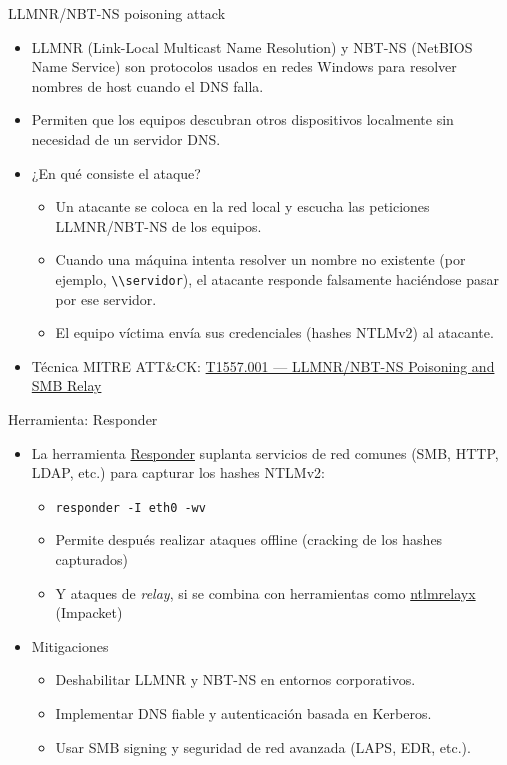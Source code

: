 \documentclass[aspectratio=169,11pt]{beamer}
\newcommand{\cmd}[1]{\texttt{#1}}
\begin{document}
\begin{frame}[allowframebreaks]{LLMNR/NBT-NS poisoning attack}
\small
  \begin{itemize}
  \item LLMNR (Link-Local Multicast Name Resolution) y NBT-NS (NetBIOS Name Service) son protocolos usados en redes Windows para resolver nombres de host cuando el DNS falla.
  \item Permiten que los equipos descubran otros dispositivos localmente sin necesidad de un servidor DNS.
  \item ¿En qué consiste el ataque?
    \begin{itemize}

  \item Un atacante se coloca en la red local y escucha las peticiones LLMNR/NBT-NS de los equipos.
  \item Cuando una máquina intenta resolver un nombre no existente (por ejemplo, \texttt{\textbackslash\textbackslash servidor}), el atacante responde falsamente haciéndose pasar por ese servidor.
  \item El equipo víctima envía sus credenciales (hashes NTLMv2) al atacante.
    \end{itemize}
  \item Técnica MITRE ATT\&CK: \href{https://attack.mitre.org/techniques/T1557/001/}{T1557.001 --- LLMNR/NBT-NS Poisoning and SMB Relay}
  \end{itemize}
\end{frame}

\begin{frame}[allowframebreaks]{Herramienta: Responder}
\small
  \begin{itemize}
  \item La herramienta \href{https://github.com/lgandx/Responder}{Responder} suplanta servicios de red comunes (SMB, HTTP, LDAP, etc.) para capturar los hashes NTLMv2:
    \begin{itemize}
    \item \cmd{responder -I eth0 -wv}
    \item Permite después realizar ataques offline (cracking de los hashes capturados)
    \item Y ataques de \emph{relay}, si se combina con herramientas como \href{https://github.com/fortra/impacket}{ntlmrelayx} (Impacket)
    \end{itemize}
  \item Mitigaciones
    \begin{itemize}
    \item Deshabilitar LLMNR y NBT-NS en entornos corporativos.
    \item Implementar DNS fiable y autenticación basada en Kerberos.
    \item Usar SMB signing y seguridad de red avanzada (LAPS, EDR, etc.).
    \end{itemize}
  \end{itemize}
\end{frame}
\end{document}
